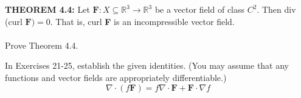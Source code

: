 \documentclass[12pt,letterpaper]{hmcpset}
\newcommand{\RR}{\mathbb{R}}
\begin{document}
\begin{problem}[Colley 3.4.16]
    \textbf{THEOREM 4.4:} Let $\textbf{F}:X\subseteq\RR^3\to\RR^3$ be
    a vector field of class $C^2$. Then div (curl
    $\textbf{F})=0$. That is, curl \textbf{F} is an incompressible
    vector field.\\\\
    Prove Theorem 4.4.
\end{problem}
\begin{solution}
    \vfill
\end{solution}
\newpage

\begin{problem}[Colley 3.4.23]
    In Exercises 21-25, establish the given identities. (You may
    assume that any functions and vector fields are appropriately
    differentiable.)
    \[
        \nabla\cdot(f\textbf{F})=f\nabla\cdot\textbf{F}+\textbf{F}\cdot\nabla f
    \]
\end{problem}
\begin{solution}
    \vfill
\end{solution}
\end{document}
